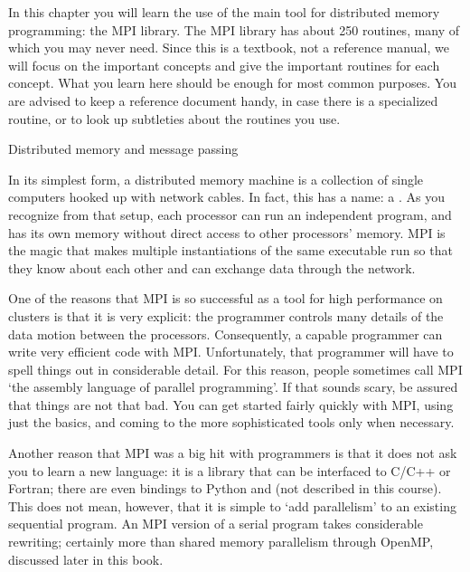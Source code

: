 
In this chapter you will learn the use of the main tool for 
distributed memory programming: the \acf{MPI} library.
The \ac{MPI} library has about 250 routines, many of which you may
never need. Since this is a textbook, not a reference manual, we will
focus on the important concepts and give the important routines for
each concept. What you learn here should be enough for most common
purposes. You are advised to keep a reference document handy, in
case there is a specialized routine, or to look up subtleties about
the routines you use.

 {Distributed memory and message passing}

In its simplest form, a distributed memory machine is a collection of
single computers hooked up with network cables. In fact, this has a name:
a . As you recognize from that setup, 
each processor can run an independent program, and has its own memory
without direct access to other processors' memory. MPI is the magic
that makes multiple instantiations of the same executable run
so that they know about each other and can exchange data through the 
network.

One of the reasons that MPI is so successful as a tool for high
performance on clusters is that it is very explicit: the programmer
controls many details of the data motion between the processors.
Consequently, a capable programmer can write very efficient code with MPI.
Unfortunately, that programmer will have to spell things out
in considerable detail. For this reason, people sometimes call MPI
`the assembly language of parallel programming'. If that sounds scary,
be assured that things are not that bad. You can get started 
fairly quickly with MPI, using just the basics,
and coming to the more sophisticated tools 
only when necessary.

Another reason that MPI was a big hit with programmers is that
it does not ask you to learn a new language: it is a library that 
can be interfaced to C/C++ or Fortran; there are even bindings to Python
and  (not described in this course).
This does not mean, however, that it is simple to
`add parallelism' to an existing sequential program.
An MPI version of a serial program takes considerable rewriting;
certainly more than shared memory parallelism through OpenMP,
discussed later in this book.

